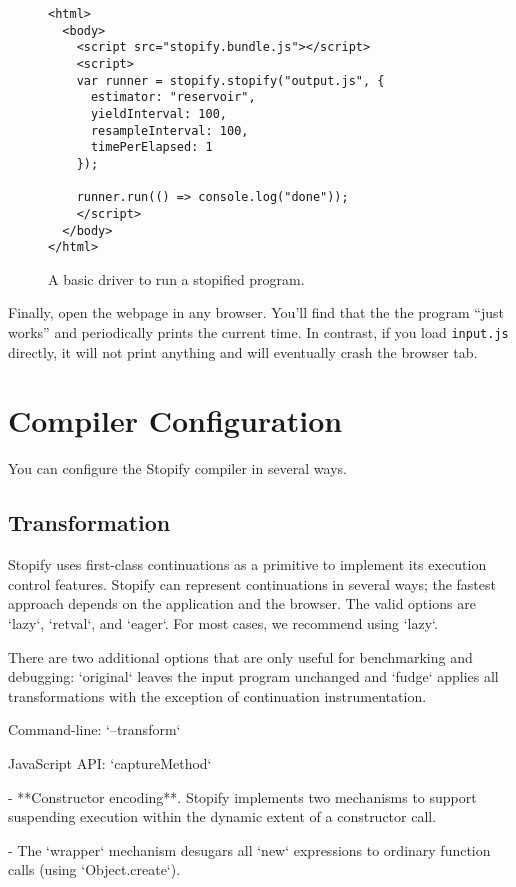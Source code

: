 \documentclass{book}
\begin{document}
\begin{figure}
\lstset{language=console}
\begin{lstlisting}
<html>
  <body>
    <script src="stopify.bundle.js"></script>
    <script>
    var runner = stopify.stopify("output.js", {
      estimator: "reservoir",
      yieldInterval: 100,
      resampleInterval: 100,
      timePerElapsed: 1
    });

    runner.run(() => console.log("done"));
    </script>
  </body>
</html>
\end{lstlisting}
\caption{A basic driver to run a stopified program.\label{trivial-driver}}
\end{figure}
  

Finally, open the webpage in any browser. You'll find that the the program
``just works'' and periodically prints the current time. In contrast, if you
load \texttt{input.js} directly, it will not print anything and will eventually
crash the browser tab.

\chapter{Compiler Configuration}

You can configure the Stopify compiler in several ways.

\section{Transformation}

Stopify uses first-class continuations as a primitive to implement its
execution control features. Stopify can represent continuations in several
ways; the fastest approach depends on the application and the browser. The
valid options are `lazy`, `retval`, and `eager`. For most cases, we recommend
using `lazy`.

   There are two additional options that are only useful for benchmarking and debugging: `original` leaves the input program unchanged and `fudge` applies all transformations with the exception of continuation instrumentation.

   Command-line: `--transform`

   JavaScript API: `captureMethod`

- **Constructor encoding**. Stopify implements two mechanisms to support
   suspending execution within the dynamic extent of a constructor call.

   - The `wrapper` mechanism desugars all `new` expressions to ordinary function
      calls (using `Object.create`).
\end{document}
